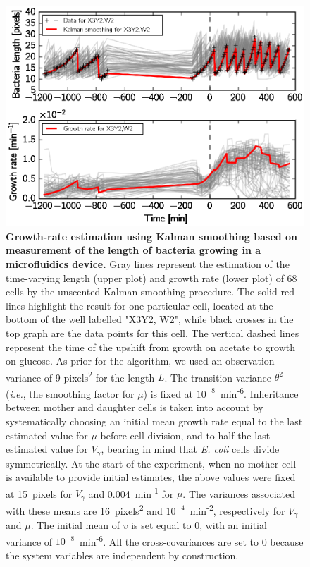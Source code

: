 \begin{figure}[p]
\centering
\includegraphics[scale=1]{./Fig/growth_rate_estimation}
\caption{
\textbf{Growth-rate estimation using Kalman smoothing based on measurement of the length of bacteria growing in a microfluidics device.}
Gray lines represent the estimation of the time-varying length (upper plot) and growth rate (lower plot) of 68 cells by the unscented Kalman smoothing procedure.
The solid red lines highlight the result for one particular cell, located at the bottom of the well labelled "X3Y2, W2", while black crosses in the top graph are the data points for this cell.
The vertical dashed lines represent the time of the upshift from growth on acetate to growth on glucose.
As prior for the algorithm, we used an observation variance of 9 pixels\textsuperscript{2} for the length $L$.
The transition variance $\theta^2$ (\textit{i.e.}, the smoothing factor for $\mu$) is fixed at $10^{-8}$~min\textsuperscript{-6}.
Inheritance between mother and daughter cells is taken into account by systematically choosing an initial mean growth rate equal to the last estimated value for $\mu$ before cell division, and to half the last estimated value for $V_\gamma$, bearing in mind that \textit{E. coli} cells divide symmetrically.
At the start of the experiment, when no mother cell is available to provide initial estimates, the above values were fixed at 15~pixels for $V_\gamma$ and 0.004~min\textsuperscript{-1} for $\mu$.
The variances associated with these means are 16~pixels\textsuperscript{2} and $10^{-4}$~min\textsuperscript{-2}, respectively for $V_\gamma$ and $\mu$.
The initial mean of $v$ is set equal to 0, with an initial variance of $10^{-8}$~min\textsuperscript{-6}.
All the cross-covariances are set to 0 because the system variables are independent by construction.
}
\label{fig:growth_rate_estimation}
\end{figure}

